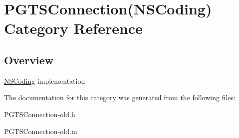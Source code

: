 \hypertarget{category_p_g_t_s_connection_07_n_s_coding_08}{}\section{P\+G\+T\+S\+Connection(N\+S\+Coding) Category Reference}
\label{category_p_g_t_s_connection_07_n_s_coding_08}


\subsection{Overview}
\hyperlink{class_n_s_coding-p}{N\+S\+Coding} implementation 

The documentation for this category was generated from the following files\+:\begin{DoxyCompactItemize}
\item 
P\+G\+T\+S\+Connection-\/old.\+h\item 
P\+G\+T\+S\+Connection-\/old.\+m\end{DoxyCompactItemize}
